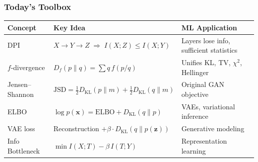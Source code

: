 \documentclass[aspectratio=169]{beamer}
\begin{document}
\begin{frame}
\frametitle{Today's Toolbox}

\vspace{-0.15cm}
\begin{center}
\footnotesize
\renewcommand{\arraystretch}{1.5}
\begin{tabular}{lll}
  \textbf{Concept} & \textbf{Key Idea} & \textbf{ML Application} \\
  \hline
  DPI & $X{\to}Y{\to}Z \;\Rightarrow\; I(X;Z) \leq I(X;Y)$ & Layers lose info, sufficient statistics \\
  $f$-divergence & $D_f(p\|q) = \sum q\,f(p/q)$ & Unifies KL, TV, $\chi^2$, Hellinger \\
  Jensen--Shannon & $\text{JSD} = \frac{1}{2}D_{\text{KL}}(p\|m) + \frac{1}{2}D_{\text{KL}}(q\|m)$ & Original GAN objective \\
  ELBO & $\log p(\mathbf{x}) = \text{ELBO} + D_{\text{KL}}(q\|p)$ & VAEs, variational inference \\
  VAE loss & Reconstruction $+ \beta\cdot D_{\text{KL}}(q\|p(\mathbf{z}))$ & Generative modeling \\
  Info Bottleneck & $\min I(X;T) - \beta\,I(T;Y)$ & Representation learning \\
  \hline
\end{tabular}
\end{center}

\vspace{0.15cm}
\begin{center}
\end{center}
\end{frame}
\end{document}
